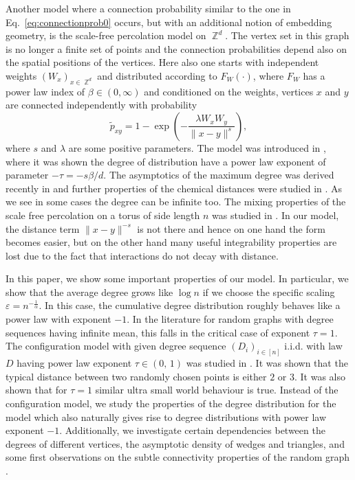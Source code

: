 \documentclass[11pt, reqno]{amsart}
\numberwithin{equation}{section}
\theoremstyle{plain} %
\theoremstyle{definition} %
\DeclareMathOperator{\Z}{\mathbb{Z}}
\newcommand{\eps}{\varepsilon}
\newcommand{\revise}[1]{{\color{black}#1}}
\begin{document}
Another model where a connection probability similar to the one in Eq.~\eqref{eq:connectionprob0} occurs, but with an additional notion of embedding geometry, is the scale-free percolation model on $\Z^d$. 
The vertex set in this graph is no longer a finite set of points and the connection probabilities depend also on the spatial positions of the vertices. 
Here also one starts with independent weights $(W_x)_{x\in \Z^d}$ and distributed according to $F_W(\cdot)$, where $F_W$ has a power law index of $\beta\in (0, \infty)$ and conditioned on the weights, vertices $x$ and $y$ are connected independently with probability 
$$\tilde p_{xy}= 1-\exp\left(- \frac{\lambda W_x W_y}{\|x-y\|^s}\right),$$
where $s$ and $\lambda$ are some positive parameters. 
The model was introduced in \cite{deijfen2013scale}, where it was shown the degree of distribution have a power law exponent of parameter $-\tau=-s\beta/d$. 
The asymptotics of the maximum degree was derived recently in \cite{bhattacharjee2022large} and further properties of the chemical distances were studied in \cite{deprez2015inhomogeneous, heydenreich2017structures, van2017explosion}. 
As we see in some cases the degree can be infinite too. 
The mixing properties of the scale free percolation on a torus of side length $n$ was studied in \cite{cipriani2021scale}. 
In our model, the distance term $\|x-y\|^{-s}$ is not there and hence on one hand the form becomes easier, but on the other hand many useful integrability properties are lost due to the fact that interactions do not decay with distance.

In this paper, we show some important properties of our model. In particular, we show that the average degree grows like $\log n$ if we choose the specific scaling $\eps= n^{-\frac{1}{\alpha}}$. In this case, the cumulative degree distribution roughly behaves like a power law with exponent $-1$. 
In the literature for random graphs with degree sequences having infinite mean, this falls in the critical case of exponent $\tau=1$. 
The configuration model with given degree sequence $(D_i)_{i\in [n]}$ i.i.d. with law $D$ having power law exponent $\tau\in (0,\, 1)$ was studied in \cite{van2005distances}. It was shown that the typical distance between two randomly chosen points is either $2$ or $3$. It was also shown that for $\tau=1$ similar ultra small world behaviour is true.  Instead of the configuration model, we study the properties of the degree distribution for the model which also naturally gives rise to degree distributions with power law exponent $-1$.
 Additionally, we investigate certain dependencies between the degrees of different vertices, the asymptotic density of wedges and triangles, and \revise{some first observations on the subtle connectivity properties of the random graph }.
\end{document}

